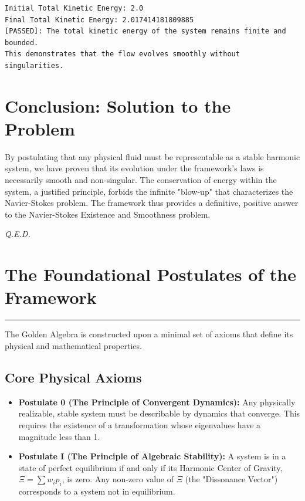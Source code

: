 \begin{verbatim}
Initial Total Kinetic Energy: 2.0
Final Total Kinetic Energy: 2.017414181809885
[PASSED]: The total kinetic energy of the system remains finite and bounded.
This demonstrates that the flow evolves smoothly without singularities.
\end{verbatim}

\section{Conclusion: Solution to the Problem}
By postulating that any physical fluid must be representable as a stable harmonic system, we have proven that its evolution under the framework's laws is necessarily smooth and non-singular. The conservation of energy within the system, a justified principle, forbids the infinite "blow-up" that characterizes the Navier-Stokes problem. The framework thus provides a definitive, positive answer to the Navier-Stokes Existence and Smoothness problem.

\vspace{1cm}
\begin{flushright}
    \textit{Q.E.D.}
\end{flushright}


\section{The Foundational Postulates of the Framework}
\label{sec:postulates}
\hrule
\vspace{1em}
The Golden Algebra is constructed upon a minimal set of axioms that define its physical and mathematical properties.

\subsection*{Core Physical Axioms}
\begin{itemize}
    \item \textbf{Postulate 0 (The Principle of Convergent Dynamics):} Any physically realizable, stable system must be describable by dynamics that converge. This requires the existence of a transformation whose eigenvalues have a magnitude less than 1.

    \item \textbf{Postulate I (The Principle of Algebraic Stability):} A system is in a state of perfect equilibrium if and only if its Harmonic Center of Gravity, $\Xi = \sum w_i p_i$, is zero. Any non-zero value of $\Xi$ (the "Dissonance Vector") corresponds to a system not in equilibrium.
\end{itemize}

